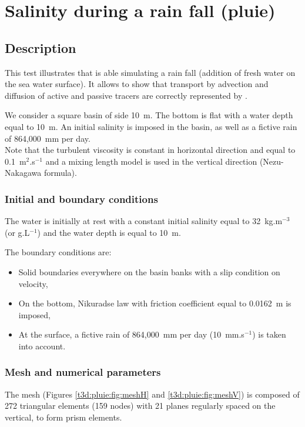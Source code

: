 \chapter{Salinity during a rain fall (pluie)}

\section{Description}
\bigskip
This test illustrates that  is able simulating a rain fall
(addition of fresh water on the sea water surface).
It allows to show that transport by advection and diffusion of active
and passive tracers are correctly represented by .

\bigskip
We consider a square basin of side 10~m. The bottom is flat with a water
depth equal to 10~m.
An initial salinity is imposed in the basin, as well as a fictive rain of 864,000~mm per day.\\
Note that the turbulent viscosity is constant in horizontal direction
and equal to 0.1~m$^2$.s$^{-1}$ and a mixing length model is
used in the vertical direction (Nezu-Nakagawa formula).

\subsection{Initial and boundary conditions}
\bigskip
The water is initially at rest with a constant initial salinity equal
to 32~kg.m$^{-3}$ (or g.L$^{-1}$) and the water depth is equal to 10~m.

\bigskip
The boundary conditions are:
\begin{itemize}
\item Solid boundaries everywhere on the basin banks with a slip condition on velocity,
\item On the bottom, Nikuradse law with friction coefficient equal to
0.0162~m is imposed,
\item At the surface, a fictive rain of 864,000~mm per day (10~mm.s$^{-1}$)
is taken into account.
\end{itemize}

\subsection{Mesh and numerical parameters}
\bigskip
The mesh (Figures \ref{t3d:pluie:fig:meshH} and \ref{t3d:pluie:fig:meshV})
is composed of 272 triangular elements (159 nodes) with 21 planes
regularly spaced on the vertical, to form prism elements.

